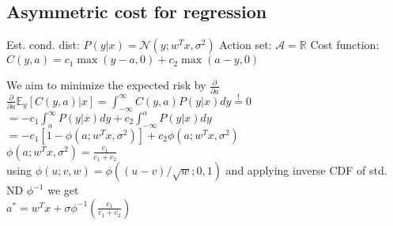 \subsection*{Asymmetric cost for regression}
\begin{itemize}
	 Est. cond. dist: $P(y|x) = \mathcal{N}(y;w^Tx, \sigma^2)$
	 Action set: $\mathcal{A} = \mathbb{R}$
	 Cost function: $C(y,a) = c_1 \max(y-a,0) + c_2 \max(a-y,0)$
\end{itemize}
We aim to minimize the expected risk by $\frac{\partial}{\partial a}$\\
$\frac{\partial}{\partial a} \mathbb{E}_y[C(y,a)|x] = \int_{-\infty}^{\infty} C(y,a) P(y | x) dy \overset{!}{=} 0$\\
$= -c_1 \int_{a}^{\infty} P(y | x) dy + c_2 \int_{-\infty}^{a} P(y | x) dy$\\
$= -c_1 [1-\phi(a; w^Tx, \sigma^2)] + c_2 \phi(a; w^Tx, \sigma^2)$\\
$\phi(a; w^Tx, \sigma^2) = \frac{c_1}{c_1 + c_2}$\\
using $\phi(u;v,w) = \phi((u-v)/\sqrt{w};0,1)$ and applying inverse CDF of std. ND $\phi^{-1}$ we get\\
$a^* = w^Tx + \sigma\phi^{-1} (\frac{c_1}{c_1 + c_2})$